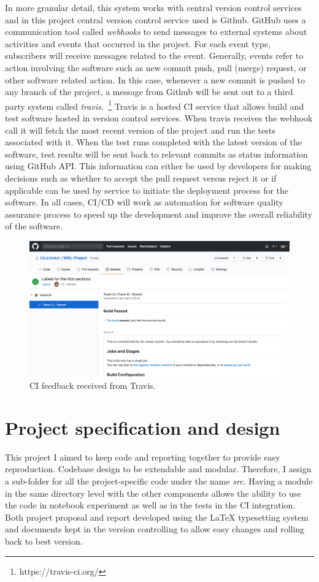 In more granular detail, this system works with central version control services and in this project central version control service used is Github. GitHub uses a communication tool called \emph{webhooks} to send messages to external systems about activities and events that occurred in the project. For each event type, subscribers will receive messages related to the event. Generally, events refer to action involving the software such as new commit push, pull (merge) request, or other software related action. In this case, whenever a new commit is pushed to any branch of the project, a message from Github will be sent out to a third party system called \emph{travis.}~\footnote{https://travis-ci.org/} Travis is a hosted CI service that allows build and test software hosted in version control services. When travis receives the webhook call it will fetch the most recent version of the project and run the tests associated with it. When the test runs completed with the latest version of the software, test results will be sent back to relevant commits as status information using GitHub API. This information can either be used by developers for making decisions such as whether to accept the pull request versus reject it or if applicable can be used by service to initiate the deployment process for the software. In all cases, CI/CD will work as automation for software quality assurance process to speed up the development and improve the overall reliability of the software.

\begin{figure}[H]
    \centering
    \includegraphics[width=\textwidth]{img/cigithub.png}
    \caption{CI feedback received from Travis.}
    \label{fig:cigithub}
\end{figure}
 


\section{Project specification and design} \label{sec:projectlayout}
This project I aimed to keep code and reporting together to provide easy reproduction. Codebase design to be extendable and modular. Therefore, I assign a sub-folder for all the project-specific code under the name \emph{src}. Having a module in the same directory level with the other components allows the ability to use the code in notebook experiment as well as in the tests in the CI integration.
Both project proposal and report developed using the LaTeX typesetting system and documents kept in the version controlling to allow easy changes and rolling back to best version.

